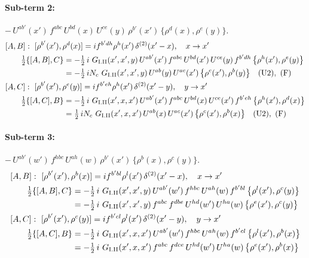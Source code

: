 \documentclass[10pt]{article}
\numberwithin{equation}{section}
\begin{document}
\paragraph{Sub-term 2:} $-\,U^{ab'}(x')\,f^{abc}\,U^{bd}(x)\,U^{ce}(y)\,\rho^{b'}(x')\,\big\{\rho^{d}(x),\rho^{e}(y)\big\}$.
\begin{align}
&[A,B]:\ [\rho^{b'}(x'),\rho^{d}(x)]=i f^{b'dh}\rho^{h}(x')\,\delta^{(2)}(x'-x),\quad x\to x'\notag\\
&\qquad \tfrac12\{[A,B],C\}=-\tfrac12\,i\,\,G_{\rm I.II}(x',x',y)\,U^{ab'}(x')\,f^{abc}\,U^{bd}(x')\,U^{ce}(y)\,f^{b'dh}\,\big\{\rho^{h}(x'),\rho^{e}(y)\big\}\notag\\
&\qquad\phantom{\tfrac12\{[A,B],C\}}=-\tfrac12\,i N_{c}\,\,G_{\rm I.II}(x',x',y)\,U^{ab}(y)\,U^{ac}(x')\,\big\{\rho^{c}(x'),\rho^{b}(y)\big\}\quad\text{(U2)},\ \text{(F)}
\label{R:eq:GI.II-2-AB}\\
&[A,C]:\ [\rho^{b'}(x'),\rho^{e}(y)]=i f^{b'eh}\rho^{h}(x')\,\delta^{(2)}(x'-y),\quad y\to x'\notag\\
&\qquad \tfrac12\{[A,C],B\}=-\tfrac12\,i\,\,G_{\rm I.II}(x',x,x')\,U^{ab'}(x')\,f^{abc}\,U^{bd}(x)\,U^{ce}(x')\,f^{b'eh}\,\big\{\rho^{h}(x'),\rho^{d}(x)\big\}\notag\\
&\qquad\phantom{\tfrac12\{[A,C],B\}}=\tfrac12\,i N_{c}\,\,G_{\rm I.II}(x',x,x')\,U^{ab}(x)\,U^{ac}(x')\,\big\{\rho^{c}(x'),\rho^{b}(x)\big\}\quad\text{(U2)},\ \text{(F)}
\label{R:eq:GI.II-2-AC}
\end{align}
\paragraph{Sub-term 3:} $-\,U^{ab'}(w')\,f^{hbc}\,U^{ah}(w)\,\rho^{b'}(x')\,\big\{\rho^{b}(x),\rho^{c}(y)\big\}$.
\begin{align}
&[A,B]:\ [\rho^{b'}(x'),\rho^{b}(x)]=i f^{b'bl}\rho^{l}(x')\,\delta^{(2)}(x'-x),\quad x\to x'\notag\\
&\qquad \tfrac12\{[A,B],C\}=-\tfrac12\,i\,\,G_{\rm I.II}(x',x',y)\,U^{ab'}(w')\,f^{hbc}\,U^{ah}(w)\,f^{b'bl}\,\big\{\rho^{l}(x'),\rho^{c}(y)\big\}\notag\\
&\qquad\phantom{\tfrac12\{[A,B],C\}}=-\tfrac12\,i\,\,G_{\rm I.II}(x',x',y)\,f^{abc}\,f^{dbe}\,U^{hd}(w')\,U^{ha}(w)\,\big\{\rho^{e}(x'),\rho^{c}(y)\big\}
\label{R:eq:GI.II-3-AB}\\
&[A,C]:\ [\rho^{b'}(x'),\rho^{c}(y)]=i f^{b'cl}\rho^{l}(x')\,\delta^{(2)}(x'-y),\quad y\to x'\notag\\
&\qquad \tfrac12\{[A,C],B\}=-\tfrac12\,i\,\,G_{\rm I.II}(x',x,x')\,U^{ab'}(w')\,f^{hbc}\,U^{ah}(w)\,f^{b'cl}\,\big\{\rho^{l}(x'),\rho^{b}(x)\big\}\notag\\
&\qquad\phantom{\tfrac12\{[A,C],B\}}=-\tfrac12\,i\,\,G_{\rm I.II}(x',x,x')\,f^{abc}\,f^{dce}\,U^{hd}(w')\,U^{ha}(w)\,\big\{\rho^{e}(x'),\rho^{b}(x)\big\}
\label{R:eq:GI.II-3-AC}
\end{align}
\end{document}
